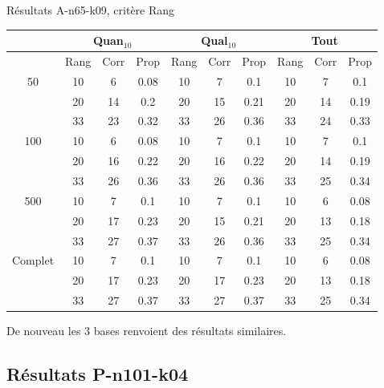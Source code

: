 \documentclass{beamer}
\begin{document}
\begin{frame}{Résultats A-n65-k09, critère Rang}
\begin{table}[H]

\begin{tabular}{|@{}c@{}|@{}c@{}|@{}c@{}|@{}c@{}||@{}c@{}|@{}c@{}|@{}c@{}||@{}c@{}|@{}c@{}|@{}c@{}|}

\hline
 & \multicolumn{3}{c|}{Quan$_{10}$} & \multicolumn{3}{c|}{Qual$_{10}$} & \multicolumn{3}{c|}{Tout} \\
 \hline
 & Rang & Corr & Prop & Rang & Corr & Prop & Rang & Corr & Prop \\
 \hline
 50 & 10  & 6 & 0.08 & 10  & 7 & 0.1 & 10  & 7 & 0.1  \\
 \cline{2-10} 
    & 20 & 14 & 0.2 & 20  & 15 & 0.21 & 20  & 14 & 0.19  \\
 \cline{2-10} 
    & 33 & 23 & 0.32 & 33 & 26 & 0.36 & 33 & 24 & 0.33  \\
  \hline
   100 & 10  & 6 & 0.08 & 10  & 7 & 0.1 & 10  & 7 & 0.1  \\
 \cline{2-10} 
    & 20 & 16 & 0.22 & 20 & 16 & 0.22 & 20 & 14 & 0.19  \\
  \cline{2-10} 
    & 33 & 26 & 0.36 & 33 & 26 & 0.36 & 33 & 25 & 0.34  \\
  \hline
   500 & 10  & 7 & 0.1 & 10  & 7 & 0.1 & 10  & 6 & 0.08  \\
 \cline{2-10} 
    & 20 & 17 & 0.23 & 20 & 15 & 0.21 & 20 & 13 & 0.18  \\
  \cline{2-10} 
    & 33 & 27 & 0.37 & 33 & 26 & 0.36 & 33 & 25 & 0.34  \\
  \hline
   Complet & 10 & 7 & 0.1 & 10 & 7 & 0.1 & 10 & 6 & 0.08  \\
 \cline{2-10} 
    & 20 & 17 & 0.23 & 20 & 17 & 0.23 & 20 & 13 & 0.18  \\
  \cline{2-10} 
    & 33 & 27 & 0.37 & 33 & 27 & 0.37 & 33 & 25 & 0.34  \\
  \hline

\end{tabular}
\end{table}

De nouveau les 3 bases renvoient des résultats similaires. 
\end{frame}



\subsection{Résultats P-n101-k04}
\end{document}
